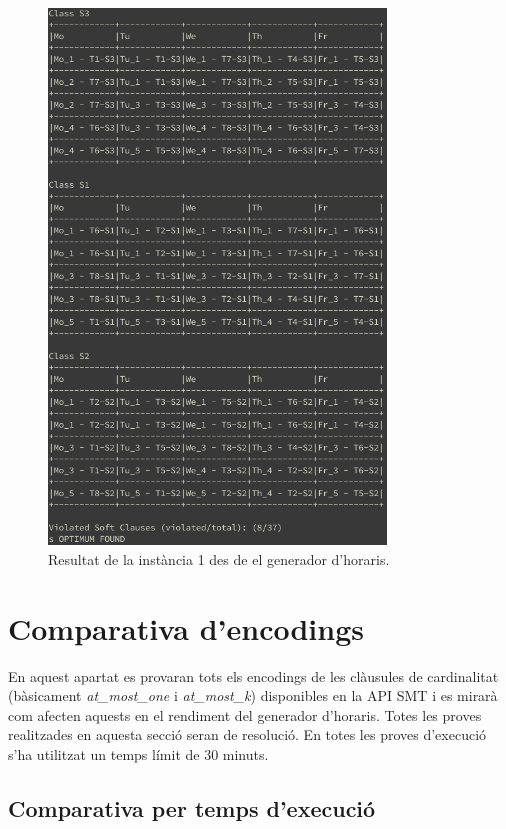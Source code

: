 \documentclass[11pt,a4paper,twoside]{report}
\begin{document}
  \begin{figure}[htp!]
    \centering
    \includegraphics[width=0.8\textwidth]{Diagrames/brazil1_terminal.png}
    \caption{Resultat de la instància 1 des de el generador d'horaris.}
    \label{fig:bi1_term}
  \end{figure}
  \newpage

  \section{Comparativa d'encodings}

  En aquest apartat es provaran tots els encodings de les clàusules de cardinalitat (bàsicament \textit{at\_most\_one} i \textit{at\_most\_k}) disponibles en la API SMT i es mirarà com afecten aquests en el rendiment del generador d'horaris. 
  Totes les proves realitzades en aquesta secció seran de resolució. En totes les proves d'execució s'ha utilitzat un temps límit de 30 minuts.

  \subsection{Comparativa per temps d'execució}
\end{document}
